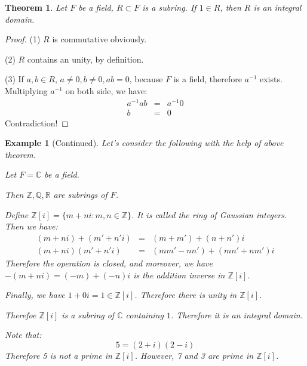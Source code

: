 \documentclass{article}
\theoremstyle{MyNonumberplain}
\theoremstyle{break}
\newtheorem*{proof}{Proof. }
\theoremstyle{break}
\newtheorem{theorem}{Theorem}[section]
\newtheorem{example}{Example}[section]
\theoremstyle{break}
\theoremstyle{definition}
\theoremstyle{break}
\begin{document}
\begin{thmbox}
    \begin{theorem}
        Let $F$ be a field, $R \subset F$ is a subring. If $1 \in R$, then $R$ is an
        integral domain.
    \end{theorem}
    \begin{prfbox}
        \begin{proof}
            (1) $R$ is commutative obviously.\bigskip

            (2) $R$ contains an unity, by definition.\bigskip
            
            (3) If $a, b \in R$, $a \neq 0, b \neq 0, a b = 0$, because $F$ is a field,
            therefore $a^{- 1}$ exists. Multiplying $a^{- 1}$ on both side, we have:
            \begin{eqnarray*}
              a^{- 1} a b & = & a^{- 1} 0\\
              b & = & 0
            \end{eqnarray*}
            Contradiction!
        \end{proof}
    \end{prfbox}
\end{thmbox}

\setcounter{example}{0}

\begin{expbox}
    \begin{example}[Continued]
        Let's consider the following with the help of above theorem.\bigskip

        Let $F =\mathbb{C}$ be a field.\bigskip
        
        Then $\mathbb{Z}, \mathbb{Q}, \mathbb{R}$ are subrings of $F$.\bigskip
        
        Define $\mathbb{Z} [i] = \{ m + n i : m, n \in \mathbb{Z} \}$. It is called
        the ring of Gaussian integers. Then we have:
        \begin{eqnarray*}
          (m + n i) + (m' + n' i) & = & (m + m') + (n + n') i\\
          (m + n i) (m' + n' i) & = & (m m' - n n') + (m n' + n m') i
        \end{eqnarray*}
        Therefore the operation is closed, and moreover, we have $- (m + n i) = (- m)
        + (- n) i$ is the addition inverse in $\mathbb{Z} [i]$.\bigskip
        
        Finally, we have $1 + 0 i = 1 \in \mathbb{Z} [i]$. Therefore there is unity in
        $\mathbb{Z} [i]$.\bigskip
        
        Therefoe $\mathbb{Z} [i]$ is a subring of $\mathbb{C}$ containing $1$.
        Therefore it is an integral domain.\bigskip
        
        Note that:
        \[ 5 = (2 + i) (2 - i) \]
        Therefore 5 is not a prime in $\mathbb{Z} [i]$. However, 7 and 3 are prime in
        $\mathbb{Z} [i]$.
    \end{example}
\end{expbox}
\end{document}

